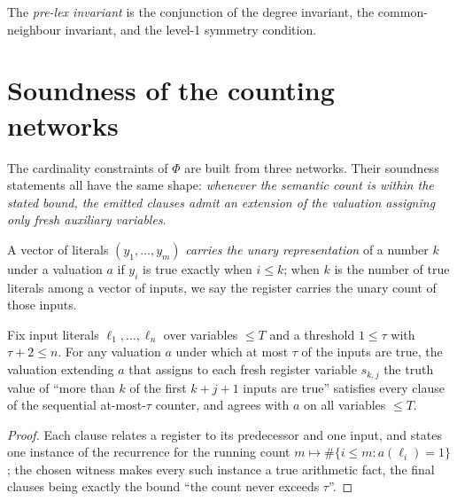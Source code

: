 \begin{definition}\label{def:enc-prelexinv}
The \emph{pre-lex invariant} is the conjunction of the degree invariant, the
common-neighbour invariant, and the level-1 symmetry condition.
\leanok
{}
\end{definition}

\section{Soundness of the counting networks}\label{ssec:enc-networks}

The cardinality constraints of $\Phi$ are built from three networks.  Their
soundness statements all have the same shape: \emph{whenever the semantic
count is within the stated bound, the emitted clauses admit an extension of
the valuation assigning only fresh auxiliary variables}.

\begin{definition}\label{def:enc-unary}
A vector of literals $(y_1,\dots,y_m)$ \emph{carries the unary
representation} of a number $k$ under a valuation $a$ if $y_i$ is true
exactly when $i \leq k$; when $k$ is the number of true literals among a
vector of inputs, we say the register carries the unary count of those
inputs.
\leanok
{}
\end{definition}

\begin{proposition}\label{prop:enc-seqcounter}
Fix input literals $\ell_1,\dots,\ell_n$ over variables $\leq T$ and a
threshold $1 \leq \tau$ with $\tau + 2 \leq n$.  For any valuation $a$ under
which at most $\tau$ of the inputs are true, the valuation extending $a$
that assigns to each fresh register variable $s_{k,j}$ the truth value of
``more than $k$ of the first $k + j + 1$ inputs are true'' satisfies every
clause of the sequential at-most-$\tau$ counter, and agrees with $a$ on all
variables $\leq T$.
\leanok
{}
\end{proposition}

\begin{proof}\leanok
Each clause relates a register to its predecessor and one input, and states
one instance of the recurrence for the running count
$m \mapsto \#\{i \leq m : a(\ell_i) = 1\}$; the chosen witness makes every
such instance a true arithmetic fact, the final clauses being exactly the
bound ``the count never exceeds $\tau$''.
\end{proof}

